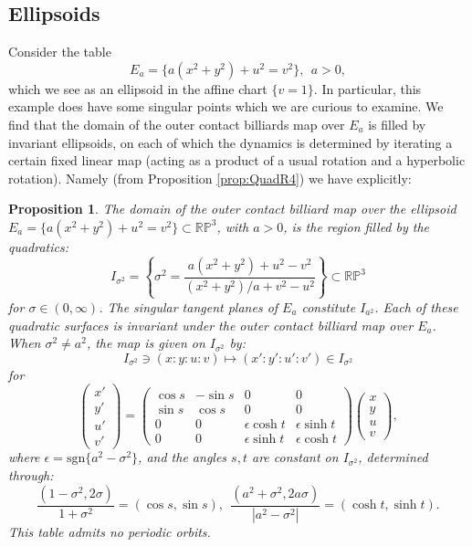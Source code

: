 \documentclass{article}
\newtheorem{prop}{Proposition}[section]
\begin{document}

\subsection{Ellipsoids}\label{sec:Sphere}

Consider the table 
\[ E_a = \{ a(x^2 + y^2) + u^2 = v^2 \}, ~~a > 0,\]
which we see as an ellipsoid in the affine chart $\{ v = 1 \}$. In particular, 
this example does have some singular points which we are curious to examine. We find that 
the domain of the outer contact billiards map over $E_a$ is filled by invariant 
ellipsoids, on each of which the dynamics is determined by iterating a certain fixed linear 
map (acting as a product of a usual rotation and a hyperbolic rotation). Namely (from 
Proposition \ref{prop:QuadR4}) we have explicitly: %

\begin{prop}
\label{prop:ellipsoid}
The domain of the outer contact billiard map over the ellipsoid $E_a= \{ a(x^2 + y^2) + u^2 = v^2 \}\subset \mathbb{RP}^3$, with $a>0$, is the region filled by the quadratics:
\[ I_{\sigma^2} = \left\{ \sigma^2 = \frac{a( x^2 + y^2) + u^2 - v^2}{(x^2 + y^2)/a + v^2 - u^2} \right\} \subset\mathbb{RP}^3\]
for $\sigma\in (0,\infty)$. The singular tangent planes of $E_a$ constitute $I_{a^2}$. 
Each of these quadratic surfaces is invariant under the outer contact billiard map over 
$E_a$. When $\sigma^2\ne a^2$, the map is given on $I_{\sigma^2}$ by:
    \[ I_{\sigma^2}\ni (x:y:u:v)\mapsto (x':y':u':v') \in I_{\sigma^2} \]
    for
    \[ \begin{pmatrix}
    x' \\ y' \\ u' \\ v'
    \end{pmatrix} = \begin{pmatrix}
        \cos s & -\sin s & 0 & 0 \\
        \sin s & \cos s& 0 & 0 \\
        0 & 0 & \epsilon\cosh t & \epsilon\sinh t \\
        0 & 0 & \epsilon\sinh t & \epsilon\cosh t
    \end{pmatrix}\begin{pmatrix}
    x \\ y \\ u \\ v
    \end{pmatrix},\]
where $\epsilon = \text{sgn}\{ a^2 - \sigma^2 \}$, and the angles $s,t$ are constant on 
$I_{\sigma^2}$, determined through:
    \[ \frac{(1-\sigma^2, 2\sigma)}{1+\sigma^2} = (\cos s, \sin s), ~~\frac{(a^2 + \sigma^2, 2a\sigma)}{|a^2 - \sigma^2|} = (\cosh t, \sinh t). \]
This table admits no periodic orbits.
\end{prop}
\end{document}

